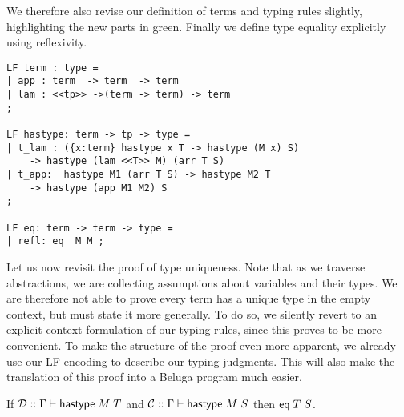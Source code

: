 We therefore also revise our definition of terms and typing rules slightly,
highlighting the new parts in green. Finally we define type equality
explicitly using reflexivity.

\begin{lstlisting}
LF term : type =
| app : term  -> term  -> term
| lam : <<tp>> ->(term -> term) -> term
;

LF hastype: term -> tp -> type =
| t_lam : ({x:term} hastype x T -> hastype (M x) S)
	-> hastype (lam <<T>> M) (arr T S)
| t_app:  hastype M1 (arr T S) -> hastype M2 T
	-> hastype (app M1 M2) S
;

LF eq: term -> term -> type =
| refl: eq  M M ;
\end{lstlisting}

Let us now revisit the proof of type uniqueness. Note that as we traverse
abstractions, we are collecting assumptions about variables and their
types. We are therefore not able to prove every term has a unique type
in the empty context, but must state it more generally. To do so, we
silently revert to an explicit context formulation of our typing
rules, since this proves to be more convenient. To make the structure
of the proof even more apparent, we already use our LF encoding to
describe our typing judgments. This will also make the translation of
this proof into a Beluga program much easier.
\label{sec:thmunique}
\begin{theorem}$\;$\\
If $\mathbin{{\mathcal{D}} :: \Gamma \vdash \mathsf{hastype}\;M\;T }$ and $\mathbin{{\mathcal{C}} :: \Gamma \vdash \mathsf{hastype}\;M\;S }$
then $\mathsf{eq}\;T\;S$.
\end{theorem}
